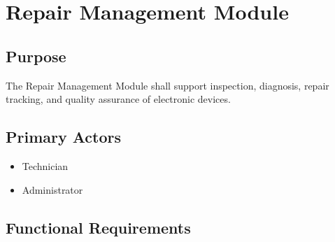 \section{Repair Management Module}
\label{sec:repair-management}

\subsection{Purpose}

The Repair Management Module shall support inspection, diagnosis,
repair tracking, and quality assurance of electronic devices.

\subsection{Primary Actors}

\begin{itemize}
\item Technician
\item Administrator
\end{itemize}

\subsection{Functional Requirements}

